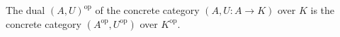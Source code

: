 The dual $(A, U)^{\text{op}}$ of the concrete category $(A, U:A \longrightarrow K)$ over $K$ is the concrete category $(A^{\text{op}}, U^{\text{op}})$ over $K^{\text{op}}$.
